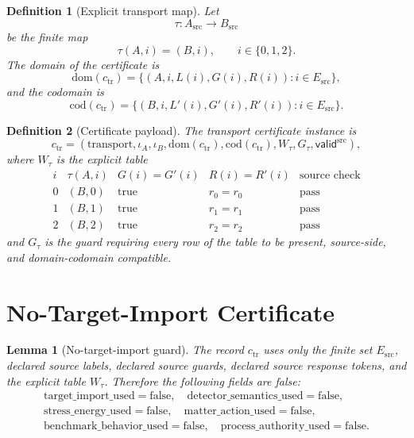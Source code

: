 \documentclass[11pt]{article}
\newcommand{\Esrc}{E_{\mathrm{src}}}
\newcommand{\Asrc}{A_{\mathrm{src}}}
\newcommand{\Bsrc}{B_{\mathrm{src}}}
\newcommand{\Valid}{\mathsf{valid}^{\mathrm{src}}}
\newtheorem{definition}{Definition}
\newtheorem{lemma}{Lemma}
\begin{document}
\begin{definition}[Explicit transport map]
Let
\[
  \tau:\Asrc\to\Bsrc
\]
be the finite map
\[
  \tau(A,i)=(B,i),\qquad i\in\{0,1,2\}.
\]
The domain of the certificate is
\[
  \mathrm{dom}(c_{\mathrm{tr}})=
  \{(A,i,L(i),G(i),R(i)):i\in\Esrc\},
\]
and the codomain is
\[
  \mathrm{cod}(c_{\mathrm{tr}})=
  \{(B,i,L'(i),G'(i),R'(i)):i\in\Esrc\}.
\]
\end{definition}

\begin{definition}[Certificate payload]
The transport certificate instance is
\[
  c_{\mathrm{tr}}=
  (\mathrm{transport},\iota_A,\iota_B,
  \mathrm{dom}(c_{\mathrm{tr}}),\mathrm{cod}(c_{\mathrm{tr}}),
  W_{\tau},G_{\tau},\Valid),
\]
where \(W_{\tau}\) is the explicit table
\[
\begin{array}{c|c|c|c|c}
i & \tau(A,i) & G(i)=G'(i) & R(i)=R'(i) & \text{source check}\\
\hline
0 & (B,0) & \mathrm{true} & r_0=r_0 & \mathrm{pass}\\
1 & (B,1) & \mathrm{true} & r_1=r_1 & \mathrm{pass}\\
2 & (B,2) & \mathrm{true} & r_2=r_2 & \mathrm{pass}
\end{array}
\]
and \(G_{\tau}\) is the guard requiring every row of the table to be present,
source-side, and domain-codomain compatible.
\end{definition}

\section{No-Target-Import Certificate}

\begin{lemma}[No-target-import guard]
The record \(c_{\mathrm{tr}}\) uses only the finite set \(\Esrc\), declared
source labels, declared source guards, declared source response tokens, and
the explicit table \(W_{\tau}\). Therefore the following fields are false:
\[
\begin{gathered}
\mathrm{target\_import\_used}=\mathrm{false},\quad
\mathrm{detector\_semantics\_used}=\mathrm{false},\\
\mathrm{stress\_energy\_used}=\mathrm{false},\quad
\mathrm{matter\_action\_used}=\mathrm{false},\\
\mathrm{benchmark\_behavior\_used}=\mathrm{false},\quad
\mathrm{process\_authority\_used}=\mathrm{false}.
\end{gathered}
\]
\end{lemma}
\end{document}
